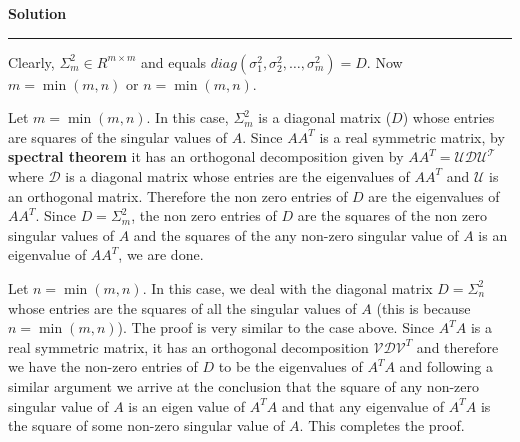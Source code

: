\documentclass[a4paper,12pt]{article}
\newenvironment{solution}[2][]{%
    \begin{mdframed}[linecolor=blue!70!black, linewidth=2pt, roundcorner=10pt, backgroundcolor=yellow!10!white, skipabove=12pt, skipbelow=12pt]%
        \textbf{\large #2}
        \par\noindent\rule{\textwidth}{0.4pt}
}{
    \end{mdframed}
}
\begin{document}
\begin{solution}{Solution}
      Clearly, $\Sigma^{2}_{m} \in R^{m \times m}$ and equals $diag(\sigma_{1}^{2},\sigma_{2}^{2},\dots , \sigma_{m}^{2}) = D$.
      Now $m = \min(m,n)$ or $n = \min(m,n)$.  

      Let $m = \min(m,n)$. In this case, $\Sigma_{m}^{2}$ is a diagonal matrix ($D$) whose entries are squares of the singular 
      values of $A$. Since $AA^{T}$ is a real symmetric matrix, by \textbf{spectral theorem}  it has an orthogonal decomposition given by 
      $AA^{T} = \mathcal{U} \mathcal{D} \mathcal{U^{T}}$ where $\mathcal{D}$ is a diagonal matrix whose entries are the eigenvalues
      of $AA^{T}$ and $\mathcal{U}$ is an orthogonal matrix. Therefore the non zero entries of $D$ are the eigenvalues of $AA^{T}$.
      Since $D = \Sigma_{m}^{2}$, the non zero entries of $D$ are the squares of the non zero singular values of $A$ and the squares of the any 
      non-zero singular value of $A$ is an eigenvalue of $AA^{T}$, we are done.

      Let $n = \min(m,n)$. In this case, we deal with the diagonal matrix $D = \Sigma_{n}^{2}$ whose entries are the squares of 
      all the singular values of $A$ (this is because $n = \min(m,n)$). The proof is very similar to the case above. Since
      $A^{T}A$ is a real symmetric matrix, it has an orthogonal decomposition $\mathcal{V} \mathcal{D} \mathcal{V}^{T}$
      and therefore we have the non-zero entries of $D$ to be the eigenvalues of $A^{T}A$ and following a similar argument we 
      arrive at the conclusion that the square of any non-zero singular value of $A$ is an eigen value of $A^{T}A$ and that
      any eigenvalue of $A^{T}A$ is the square of some non-zero singular value of $A$. This completes the proof.
      
\end{solution}
\end{document}
